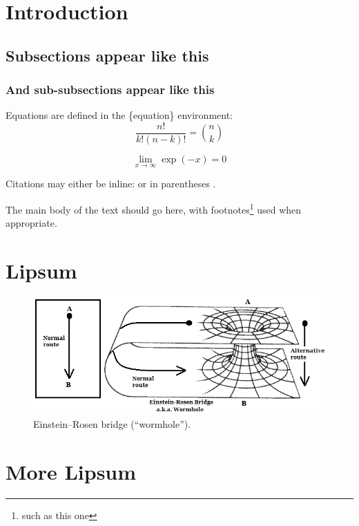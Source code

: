 \section{Introduction}

\subsection{Subsections appear like this}
\subsubsection{And  sub-subsections appear like this}

Equations are defined in the \{equation\} environment:
 \begin{equation}
\frac{n!}{k!(n-k)!} = \binom{n}{k}
\end{equation}

\begin{equation}
\lim_{x \to \infty} \exp(-x) = 0
\end{equation}

Citations may either be inline: \citet{einstein1935particle} or in parentheses \citep{einstein1935particle}.

The main body of the text should go here, with footnotes\footnote{such as this one} used when appropriate.
\section{Lipsum}
\lipsum

\begin{figure}\includegraphics[width=\columnwidth]{ER-bridge}
\caption{Einstein--Rosen bridge (``wormhole'').}
\label{fig:1}
\end{figure}
\section{More Lipsum}

\lipsum
